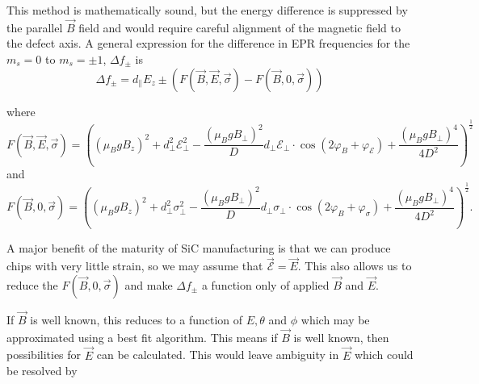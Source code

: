 This method is mathematically sound, but the energy difference is suppressed by the parallel $\vec{B}$ field and would require careful alignment of the magnetic field to the defect axis.
A general expression for the difference in EPR frequencies for the $m_s = 0$ to $m_s = \pm1$, $\Delta f_\pm$ is \cite{Dolde2011}
\begin{equation}
	\Delta f _\pm = d_\parallel E_z \pm \left(F(\vec{B},\vec{E},\vec{\sigma}) - F(\vec{B},0,\vec{\sigma})\right)
	\label{eq:}
\end{equation}

where
\begin{equation}
	F(\vec{B},\vec{E},\vec{\sigma}) = \left((\mu_B g B_z)^2 + d_\perp^2 \mathcal{E}_\perp^2 - \frac{(\mu_B g B_\perp)^2}{D} d_\perp \mathcal{E}_\perp \cdot \cos(2 \varphi_B + \varphi_\mathcal{E}) + \frac{(\mu_B g B_\perp)^4}{4D^2}  \right)^{\frac{1}{2}}
	\label{eq:}
\end{equation}
and
\begin{equation}
	F(\vec{B},0,\vec{\sigma}) = \left((\mu_B g B_z)^2 + d_\perp^2 \sigma_\perp^2 - \frac{(\mu_B g B_\perp)^2}{D} d_\perp \sigma_\perp \cdot \cos(2 \varphi_B + \varphi_\sigma) + \frac{(\mu_B g B_\perp)^4}{4D^2}  \right)^{\frac{1}{2}}.
	\label{eq:}
\end{equation}

{\color{edired}
    A major benefit of the maturity of SiC manufacturing is that we can produce chips with very little strain, so we may assume that $\vec{\mathcal{E}} = \vec{E}$. 
    This also allows us to reduce the $F(\vec{B}, 0, \vec{\sigma})$ and make $\Delta f_{\pm}$ a function only of applied $\vec{B}$ and $\vec{E}$. 

    If $\vec{B}$ is well known, this reduces to a function of $E, \theta$ and $\phi$ which may be approximated using a best fit algorithm. 
    This means if $\vec{B}$ is well known, then possibilities for $\vec{E}$ can be calculated. This would leave ambiguity in $\vec{E}$ which could be resolved by  
}



